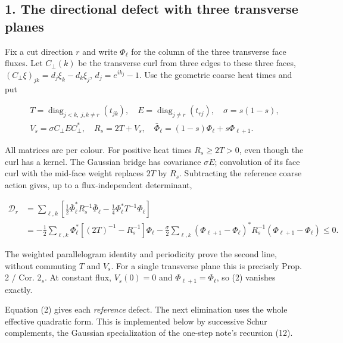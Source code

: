 \documentclass[11pt,a4paper]{article}
\begin{document}
\hypertarget{the-directional-defect-with-three-transverse-planes}{%
\subsection{1. The directional defect with three transverse
planes}\label{the-directional-defect-with-three-transverse-planes}}

Fix a cut direction \(r\) and write \(\Phi_\ell\) for the column of the
three transverse face fluxes. Let \(C_\perp(k)\) be the transverse curl
from three edges to these three faces,
\((C_\perp\xi)_{jk}=d_j\xi_k-d_k\xi_j\), \(d_j=e^{ik_j}-1\). Use the
geometric coarse heat times and put

\[\begin{gathered}
 T=\operatorname{diag}_{j<k,\ j,k\ne r}(t_{jk}),\quad
 E=\operatorname{diag}_{j\ne r}(t_{rj}),\quad \sigma=s(1-s),\\
 V_s=\sigma C_\perp E C_\perp^*,\quad R_s=2T+V_s,\quad
 \bar\Phi_\ell=(1-s)\Phi_\ell+s\Phi_{\ell+1}.
\end{gathered}\]

All matrices are per colour. For positive heat times \(R_s\ge2T>0\),
even though the curl has a kernel. The Gaussian bridge has covariance
\(\sigma E\); convolution of its face curl with the mid-face weight
replaces \(2T\) by \(R_s\). Subtracting the reference coarse action
gives, up to a flux-independent determinant,

\[\begin{aligned}
 \mathcal D_r
 &=\sum_{\ell,k}\left[
 \tfrac12\bar\Phi_\ell^*R_s^{-1}\bar\Phi_\ell
       -\tfrac14\Phi_\ell^*T^{-1}\Phi_\ell\right]\\
 &=-\tfrac12\sum_{\ell,k}\Phi_\ell^*
       [(2T)^{-1}-R_s^{-1}]\Phi_\ell
   -\tfrac\sigma2\sum_{\ell,k}(\Phi_{\ell+1}-\Phi_\ell)^*
       R_s^{-1}(\Phi_{\ell+1}-\Phi_\ell)\le0.
\end{aligned}\tag{2}\]

The weighted parallelogram identity and periodicity prove the second
line, without commuting \(T\) and \(V_s\). For a single transverse plane
this is precisely Prop. 2 / Cor. 2\(_s\). At constant flux, \(V_s(0)=0\)
and \(\Phi_{\ell+1}=\Phi_\ell\), so (2) vanishes exactly.

Equation (2) gives each \emph{reference} defect. The next elimination
uses the whole effective quadratic form. This is implemented below by
successive Schur complements, the Gaussian specialization of the
one-step note's recursion (12).
\end{document}
